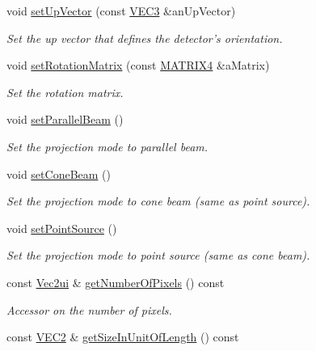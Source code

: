 \begin{DoxyCompactItemize}
void \hyperlink{classg_virtual_x_ray_1_1_x_ray_detector_aa314d10cf703d9bdeb990cfb48dd8b98}{setUpVector} (const \hyperlink{class_math_1_1_vec3}{VEC3} \&anUpVector)
\begin{DoxyCompactList}\small\item\em Set the up vector that defines the detector's orientation. \end{DoxyCompactList}\item 
void \hyperlink{classg_virtual_x_ray_1_1_x_ray_detector_a8ee8fd3a51eb1f69b17d8d3f9cf6abf5}{setRotationMatrix} (const \hyperlink{class_math_1_1_matrix4x4}{MATRIX4} \&aMatrix)
\begin{DoxyCompactList}\small\item\em Set the rotation matrix. \end{DoxyCompactList}\item 
void \hyperlink{classg_virtual_x_ray_1_1_x_ray_detector_a057d66f5441834356cfe12eec8a07f3f}{setParallelBeam} ()
\begin{DoxyCompactList}\small\item\em Set the projection mode to parallel beam. \end{DoxyCompactList}\item 
void \hyperlink{classg_virtual_x_ray_1_1_x_ray_detector_aa14a5b6d79649f4f9dd02aa502cee45a}{setConeBeam} ()
\begin{DoxyCompactList}\small\item\em Set the projection mode to cone beam (same as point source). \end{DoxyCompactList}\item 
void \hyperlink{classg_virtual_x_ray_1_1_x_ray_detector_a815ce2cb19adb38f11a9e2572aa9095c}{setPointSource} ()
\begin{DoxyCompactList}\small\item\em Set the projection mode to point source (same as cone beam). \end{DoxyCompactList}\item 
const \hyperlink{class_math_1_1_vec2}{Vec2ui} \& \hyperlink{classg_virtual_x_ray_1_1_x_ray_detector_a159d091558da004b17a4d5cccea0e672}{getNumberOfPixels} () const 
\begin{DoxyCompactList}\small\item\em Accessor on the number of pixels. \end{DoxyCompactList}\item 
const \hyperlink{class_math_1_1_vec2}{VEC2} \& \hyperlink{classg_virtual_x_ray_1_1_x_ray_detector_ab1889277924050412fdddc6716e5bc0c}{getSizeInUnitOfLength} () const 

\end{DoxyCompactItemize}
